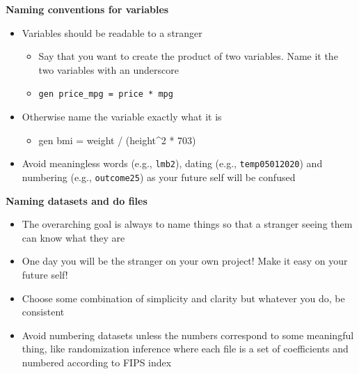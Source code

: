 \documentclass[notes=show]{beamer}
\begin{document}
\begin{frame}[plain]
\begin{center}
\textbf{Naming conventions for variables}
\end{center}

\begin{itemize}
\item Variables should be readable to a stranger
	\begin{itemize}
	\item Say that you want to create the product of two variables. Name it the two variables with an underscore
	\item \texttt{gen price_mpg = price * mpg}
	\end{itemize}
\item Otherwise name the variable exactly what it is
	\begin{itemize}
	\item gen bmi = weight / (height^2 * 703)
	\end{itemize}
\item Avoid meaningless words (e.g., \texttt{lmb2}), dating (e.g., \texttt{temp05012020}) and numbering (e.g., \texttt{outcome25}) as your future self will be confused
\end{itemize}

\end{frame}

\begin{frame}[plain]
\begin{center}
\textbf{Naming datasets and do files}
\end{center}

\begin{itemize}

\item The overarching goal is always to name things so that a stranger seeing them can know what they are
\item One day you will be the stranger on your own project!  Make it easy on your future self!
\item Choose some combination of simplicity and clarity but whatever you do, be consistent
\item Avoid numbering datasets unless the numbers correspond to some meaningful thing, like randomization inference where each file is a set of coefficients and numbered according to FIPS index

\end{itemize}

\end{frame}
\end{document}
